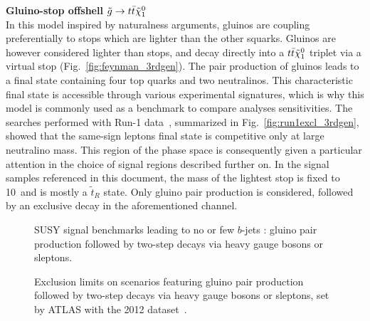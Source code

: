 \par{\bf Gluino-stop offshell $\tilde{g}\to t\bar t\tilde{\chi}_{1}^{0}$\\}
In this model inspired by naturalness arguments, gluinos are coupling preferentially to stops which are lighter than the other squarks. 
Gluinos are however considered lighter than stops, and decay directly into a $t\bar t\tilde{\chi}_{1}^{0}$ triplet via a virtual stop (Fig.~\ref{fig:feynman_3rdgen}). 
The pair production of gluinos leads to a final state containing four top quarks and two neutralinos. 
This characteristic final state is accessible through various experimental signatures, which is why this model 
is commonly used as a benchmark to compare analyses sensitivities. 
The searches performed with Run-1 data~\cite{DraftSquarkGluinoSummaryPaper}, 
summarized in Fig.~\ref{fig:run1excl_3rdgen}, showed that the same-sign leptons final state is competitive only at large neutralino mass. 
This region of the phase space is consequently given a particular attention in the choice of signal regions described further on. 
In the signal samples referenced in this document, the mass of the lightest stop is fixed to 10~\TeV and is mostly a $\widetilde{t}_R$ state. 
Only gluino pair production is considered, followed by an exclusive decay in the aforementioned channel. 
\\

\begin{figure}[h!]
\centering
{}\hspace{3cm}
\caption{SUSY signal benchmarks leading to no or few $b$-jets : 
gluino pair production followed by two-step decays via heavy gauge bosons or sleptons.}
\label{fig:feynman_1stgen}
\end{figure}

\begin{figure}[t]
\centering
{}
\caption{Exclusion limits on scenarios featuring gluino pair production followed by two-step decays via heavy gauge bosons or sleptons, 
set by ATLAS with the 2012 dataset~\cite{DraftSquarkGluinoSummaryPaper}.}
\label{fig:run1excluded_1stgen}
\end{figure}

